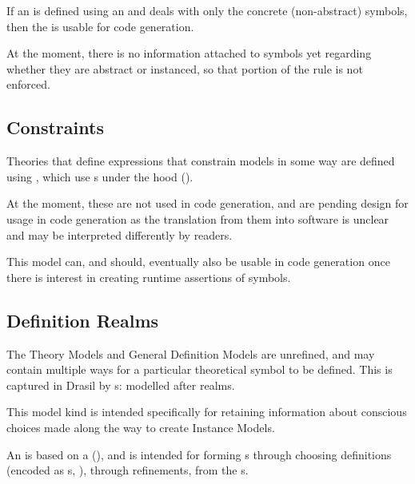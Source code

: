 If an \EquationalModel{} is defined using an \Expr{} and deals with only the
concrete (non-abstract) symbols, then the \EquationalModel{} is usable for code
generation.

At the moment, there is no information attached to symbols yet regarding whether
they are abstract or instanced, so that portion of the rule is not enforced.


\subsection{Constraints}

\currentConstraintSetHaskell{}

Theories that define expressions that constrain models in some way are defined
using \EquationalConstraints{}, which use \ConstraintSet{}s under the hood
().
	
At the moment, these are not used in code generation, and are pending design for
usage in code generation as the translation from them into software is unclear
and may be interpreted differently by readers.

This model can, and should, eventually also be usable in code generation once
there is interest in creating runtime assertions of symbols.


\subsection{Definition Realms}

\currentDefiningExprHaskell{}

\currentMultiDefnHaskell{}

The Theory Models and General Definition Models are unrefined, and may contain
multiple ways for a particular theoretical symbol to be defined. This is
captured in Drasil by \EquationalRealm{}s: modelled after realms.

This model kind is intended specifically for retaining information about
conscious choices made along the way to create Instance Models.

An \EquationalRealm{} is based on a \MultiDefn{}
(), and is intended for forming \QDefinition{}s
through choosing definitions (encoded as \DefiningExpr{}s,
), through refinements, from the \MultiDefn{}s.

